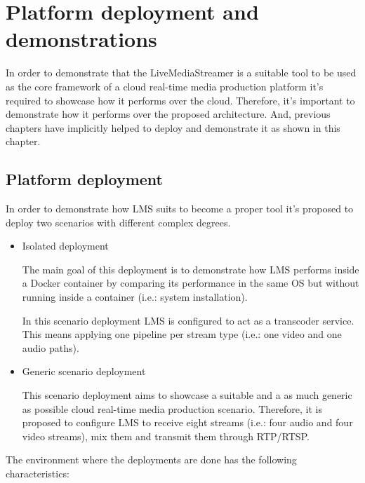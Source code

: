 \chapter{Platform deployment and demonstrations}\label{H:platformDeploymentAndDemonstrations}

In order to demonstrate that the LiveMediaStreamer is a suitable tool to be used as the core framework of a cloud real-time media production platform it's required to showcase how it performs over the cloud. Therefore, it's important to demonstrate how it performs over the proposed architecture. And, previous chapters have implicitly helped to deploy and demonstrate it as shown in this chapter.

\section{Platform deployment}

In order to demonstrate how LMS suits to become a proper tool it's proposed to deploy two scenarios with different complex degrees.

\begin{itemize}
\item Isolated deployment \hfill

The main goal of this deployment is to demonstrate how LMS performs inside a Docker container by comparing its performance in the same OS but without running inside a container (i.e.: system installation).

In this scenario deployment LMS is configured to act as a transcoder service. This means applying one pipeline per stream type (i.e.: one video and one audio paths).

\item Generic scenario deployment \hfill

This scenario deployment aims to showcase a suitable and a as much generic as possible cloud real-time media production scenario. Therefore, it is proposed to configure LMS to receive eight streams (i.e.: four audio and four video streams), mix them and transmit them through RTP/RTSP. 
\end{itemize}

The environment where the deployments are done has the following characteristics:

